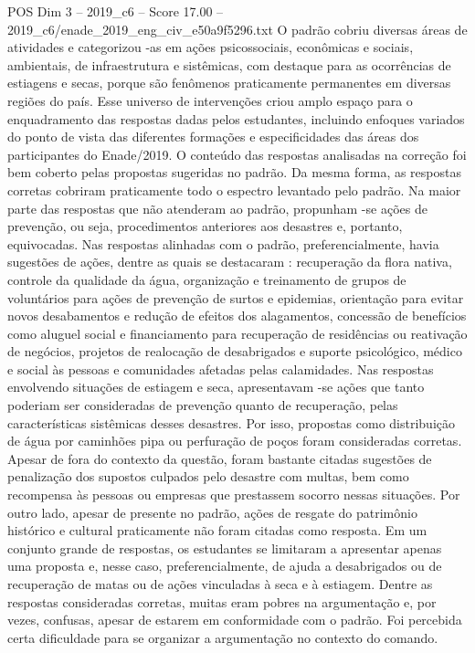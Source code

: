 \begin{textsample}{POS Dim 3 – 2019\_c6 – Score 17.00 – 2019\_c6/enade\_2019\_eng\_civ\_e50a9f5296.txt}
O padrão cobriu diversas áreas de atividades e categorizou -as em ações psicossociais, econômicas e sociais, ambientais, de infraestrutura e sistêmicas, com destaque para as ocorrências de estiagens e secas, porque são fenômenos praticamente permanentes em diversas regiões do país.
Esse universo de intervenções criou amplo espaço para o enquadramento das respostas dadas pelos estudantes, incluindo enfoques variados do ponto de vista das diferentes formações e especificidades das áreas dos participantes do Enade/2019.
O conteúdo das respostas analisadas na correção foi bem coberto pelas propostas sugeridas no padrão.
Da mesma forma, as respostas corretas cobriram praticamente todo o espectro levantado pelo padrão.
Na maior parte das respostas que não atenderam ao padrão, propunham -se ações de prevenção, ou seja, procedimentos anteriores aos desastres e, portanto, equivocadas.
Nas respostas alinhadas com o padrão, preferencialmente, havia sugestões de ações, dentre as quais se destacaram : recuperação da flora nativa, controle da qualidade da água, organização e treinamento de grupos de voluntários para ações de prevenção de surtos e epidemias, orientação para evitar novos desabamentos e redução de efeitos dos alagamentos, concessão de benefícios como aluguel social e financiamento para recuperação de residências ou reativação de negócios, projetos de realocação de desabrigados e suporte psicológico, médico e social às pessoas e comunidades afetadas pelas calamidades.
Nas respostas envolvendo situações de estiagem e seca, apresentavam -se ações que tanto poderiam ser consideradas de prevenção quanto de recuperação, pelas características sistêmicas desses desastres.
Por isso, propostas como distribuição de água por caminhões pipa ou perfuração de poços foram consideradas corretas.
Apesar de fora do contexto da questão, foram bastante citadas sugestões de penalização dos supostos culpados pelo desastre com multas, bem como recompensa às pessoas ou empresas que prestassem socorro nessas situações.
Por outro lado, apesar de presente no padrão, ações de resgate do patrimônio histórico e cultural praticamente não foram citadas como resposta.
Em um conjunto grande de respostas, os estudantes se limitaram a apresentar apenas uma proposta e, nesse caso, preferencialmente, de ajuda a desabrigados ou de recuperação de matas ou de ações vinculadas à seca e à estiagem.
Dentre as respostas consideradas corretas, muitas eram pobres na argumentação e, por vezes, confusas, apesar de estarem em conformidade com o padrão.
Foi percebida certa dificuldade para se organizar a argumentação no contexto do comando.

\end{textsample}
